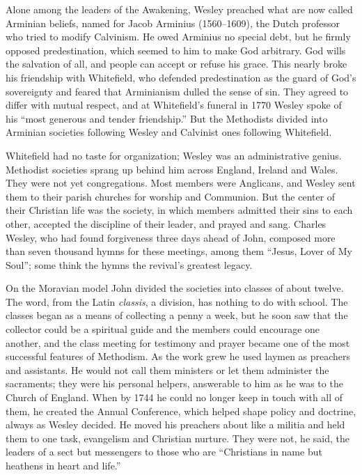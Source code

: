 Alone among the leaders of the Awakening, Wesley preached what are now called Arminian beliefs, named
for Jacob Arminius (1560--1609), the Dutch professor who tried to modify Calvinism. He owed Arminius
no special debt, but he firmly opposed predestination, which seemed to him to make God arbitrary. God
wills the salvation of all, and people can accept or refuse his grace. This nearly broke his
friendship with Whitefield, who defended predestination as the guard of God's sovereignty and feared
that Arminianism dulled the sense of sin. They agreed to differ with mutual respect, and at
Whitefield's funeral in 1770 Wesley spoke of his ``most generous and tender friendship.'' But the
Methodists divided into Arminian societies following Wesley and Calvinist ones following Whitefield.

Whitefield had no taste for organization; Wesley was an administrative genius. Methodist societies
sprang up behind him across England, Ireland and Wales. They were not yet congregations. Most members
were Anglicans, and Wesley sent them to their parish churches for worship and Communion. But the
center of their Christian life was the society, in which members admitted their sins to each other,
accepted the discipline of their leader, and prayed and sang. Charles Wesley, who had found
forgiveness three days ahead of John, composed more than seven thousand hymns for these meetings, among them
``Jesus, Lover of My Soul''; some think the hymns the revival's greatest legacy.

On the Moravian model John divided the societies into classes of about twelve. The word, from the
Latin \emph{classis}, a division, has nothing to do with school. The classes began as a means of
collecting a penny a week, but he soon saw that the collector could be a spiritual guide and the
members could encourage one another, and the class meeting for testimony and prayer became one of the
most successful features of Methodism. As the work grew he used laymen as preachers and assistants.
He would not call them ministers or let them administer the sacraments; they were his personal
helpers, answerable to him as he was to the Church of England. When by 1744 he could no longer keep
in touch with all of them, he created the Annual Conference, which helped shape policy and doctrine,
always as Wesley decided. He moved his preachers about like a militia and held them to one task,
evangelism and Christian nurture. They were not, he said, the leaders of a sect but messengers to
those who are ``Christians in name but heathens in heart and life.''

